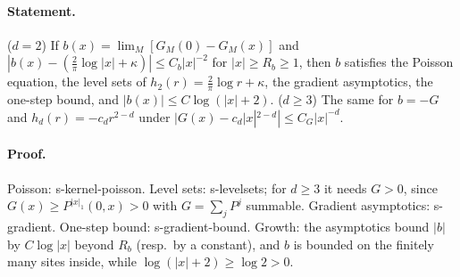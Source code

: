 \paragraph{Statement.} ($d=2$) If $b(x)=\lim_M[G_M(0)-G_M(x)]$ and $|b(x)-(\frac2\pi\log|x|+\kappa)|\leq C_b|x|^{-2}$ for $|x|\geq R_b\geq1$, then $b$
satisfies the Poisson equation, the level sets of $h_2(r)=\frac2\pi\log r+\kappa$, the gradient asymptotics, the one-step bound, and
$|b(x)|\leq C\log(|x|+2)$. ($d\geq3$) The same for $b=-G$ and $h_d(r)=-c_dr^{2-d}$ under $|G(x)-c_d|x|^{2-d}|\leq C_G|x|^{-d}$.
\paragraph{Proof.} Poisson: s-kernel-poisson. Level sets: s-levelsets; for $d\geq3$ it needs $G>0$, since $G(x)\geq P^{|x|_1}(0,x)>0$ with
$G=\sum_jP^j$ summable. Gradient asymptotics: s-gradient. One-step bound: s-gradient-bound. Growth: the asymptotics bound $|b|$ by
$C\log|x|$ beyond $R_b$ (resp.\ by a constant), and $b$ is bounded on the finitely many sites inside, while $\log(|x|+2)\geq\log2>0$.
